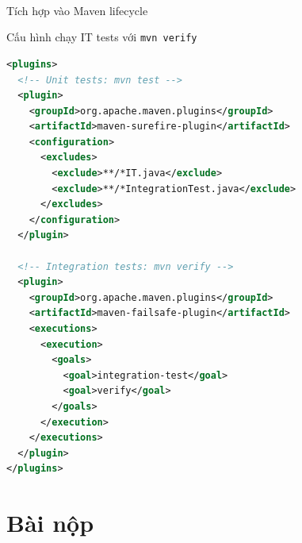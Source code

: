 \documentclass[aspectratio=169,10pt]{beamer}
\newcommand{\sref}[1]{\textsuperscript{\scriptsize\cite{#1}}}
\begin{document}
\begin{frame}[fragile]{Tích hợp vào Maven lifecycle\sref{maven-failsafe}}
  \begin{block}{Cấu hình chạy IT tests với \texttt{mvn verify}}
\begin{lstlisting}[language=XML,style=small]
<plugins>
  <!-- Unit tests: mvn test -->
  <plugin>
    <groupId>org.apache.maven.plugins</groupId>
    <artifactId>maven-surefire-plugin</artifactId>
    <configuration>
      <excludes>
        <exclude>**/*IT.java</exclude>
        <exclude>**/*IntegrationTest.java</exclude>
      </excludes>
    </configuration>
  </plugin>

  <!-- Integration tests: mvn verify -->
  <plugin>
    <groupId>org.apache.maven.plugins</groupId>
    <artifactId>maven-failsafe-plugin</artifactId>
    <executions>
      <execution>
        <goals>
          <goal>integration-test</goal>
          <goal>verify</goal>
        </goals>
      </execution>
    </executions>
  </plugin>
</plugins>
\end{lstlisting}
  \end{block}
\end{frame}

\section{Bài nộp}
\end{document}
